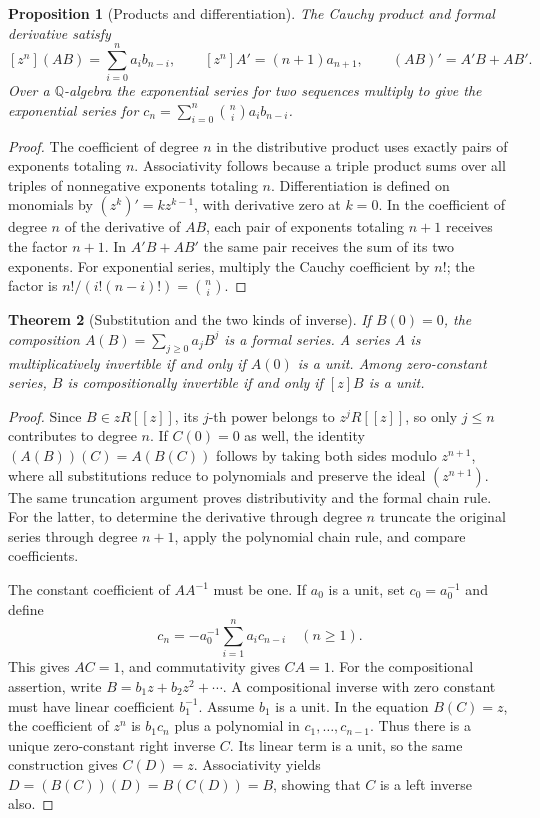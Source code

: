 \documentclass[11pt,oneside,openany]{book}
\theoremstyle{plain}
\newtheorem{theorem}{Theorem}[chapter]
\newtheorem{proposition}[theorem]{Proposition}
\theoremstyle{definition}
\theoremstyle{remark}
\begin{document}
\begin{proposition}[Products and differentiation]\label{p204:W11}
The Cauchy product and formal derivative satisfy
\[
 [z^n](AB)=\sum_{i=0}^n a_i b_{n-i},\qquad
 [z^n]A'=(n+1)a_{n+1},\qquad (AB)'=A'B+AB'.
\]
Over a \(\mathbb Q\)-algebra the exponential series for two
sequences multiply to give the exponential series for
\(c_n=\sum_{i=0}^n\binom ni a_i b_{n-i}\).
\end{proposition}
\begin{proof}
The coefficient of degree \(n\) in the distributive product uses
exactly pairs of exponents totaling \(n\). Associativity follows
because a triple product sums over all triples of nonnegative
exponents totaling \(n\). Differentiation is defined on monomials
by \((z^k)'=kz^{k-1}\), with derivative zero at \(k=0\).
In the coefficient of degree \(n\) of the derivative of \(AB\),
each pair of exponents totaling \(n+1\) receives the factor \(n+1\).
In \(A'B+AB'\) the same pair receives the sum of its two exponents.
For exponential series, multiply the Cauchy coefficient by \(n!\);
the factor is \(n!/(i!(n-i)!)=\binom ni\).
\end{proof}

\begin{theorem}[Substitution and the two kinds of inverse]
\label{p204:W12}
If \(B(0)=0\), the composition \(A(B)=\sum_{j\ge0}a_jB^j\)
is a formal series. A series \(A\) is multiplicatively invertible
if and only if \(A(0)\) is a unit. Among zero-constant series,
\(B\) is compositionally invertible if and only if \([z]B\)
is a unit.
\end{theorem}
\begin{proof}
Since \(B\in zR[[z]]\), its \(j\)-th power belongs to
\(z^jR[[z]]\), so only \(j\le n\) contributes to degree \(n\).
If \(C(0)=0\) as well, the identity
\((A(B))(C)=A(B(C))\) follows by taking both sides modulo
\(z^{n+1}\), where all substitutions reduce to polynomials
and preserve the ideal \((z^{n+1})\). The same truncation
argument proves distributivity and the formal chain rule.
For the latter, to determine the derivative through degree \(n\)
truncate the original series through degree \(n+1\), apply the
polynomial chain rule, and compare coefficients.

The constant coefficient of \(AA^{-1}\) must be one. If \(a_0\)
is a unit, set \(c_0=a_0^{-1}\) and define
\[
 c_n=-a_0^{-1}\sum_{i=1}^n a_i c_{n-i}\quad(n\ge1).
\]
This gives \(AC=1\), and commutativity gives \(CA=1\).
For the compositional assertion, write
\(B=b_1z+b_2z^2+\cdots\). A compositional inverse with zero constant
must have linear coefficient \(b_1^{-1}\).
Assume \(b_1\) is a unit. In the equation \(B(C)=z\), the
coefficient of \(z^n\) is \(b_1 c_n\) plus a polynomial in
\(c_1,\ldots,c_{n-1}\). Thus there is a unique zero-constant
right inverse \(C\). Its linear term is a unit, so the same
construction gives \(C(D)=z\). Associativity yields
\(D=(B(C))(D)=B(C(D))=B\), showing that \(C\) is a left
inverse also.
\end{proof}
\end{document}
